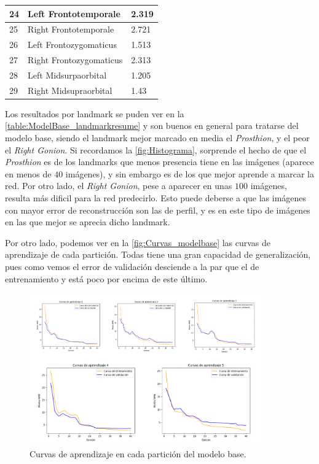 \begin{table}[!ht]
\begin{tabular}{|l|l|l|}
                24 & Left Frontotemporale & 2.319 \\ \hline
                25 & Right Frontotemporale & 2.721 \\ \hline
                26 & Left Frontozygomaticus & 1.513 \\ \hline
                27 & Right Frontozygomaticus & 2.313 \\ \hline
                28 & Left Midsurpaorbital & 1.205 \\ \hline
                29 & Right Midsupraorbital & 1.43 \\ \hline
            \end{tabular}
            \label{table:ModelBase_landmarkresume}
        \end{table}

        \medskip

        \noindent Los resultados por landmark se puden ver en la \autoref{table:ModelBase_landmarkresume} y son buenos en general para tratarse del modelo base, siendo el landmark mejor marcado en media el \textit{Prosthion}, y el peor el \textit{Right Gonion}. Si recordamos la \autoref{fig:Histograma}, sorprende el hecho de que el \textit{Prosthion} es de los landmarks que menos presencia tiene en las imágenes (aparece en menos de $40$ imágenes), y sin embargo es de los que mejor aprende a marcar la red. Por otro lado, el \textit{Right Gonion}, pese a aparecer en unas $100$ imágenes, resulta más dificil para la red predecirlo. Esto puede deberse a que las imágenes con mayor error de reconstrucción son las de perfil, y es en este tipo de imágenes en las que mejor se aprecia dicho landmark.

        \medskip

        \noindent Por otro lado, podemos ver en la \autoref{fig:Curvas_modelbase} las curvas de aprendizaje de cada partición. Todas tiene una gran capacidad de generalización, pues como vemos el error de validación desciende a la par que el de entrenamiento y está poco por encima de este último.

        \begin{figure}[!h]
            \centering
            \includegraphics[width=0.9\textwidth]{img/curvas_aprendizaje_modelbase.png}
            \caption{Curvas de aprendizaje en cada partición del modelo base.}
            \label{fig:Curvas_modelbase}
        \end{figure}

